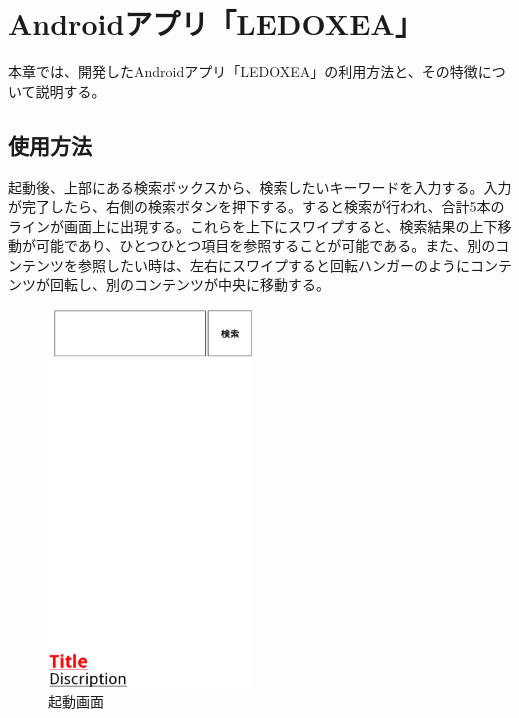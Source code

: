 \chapter{Androidアプリ「LEDOXEA」}
\label{chap:ledoxea}

本章では、開発したAndroidアプリ「LEDOXEA」の利用方法と、その特徴について説明する。

\section{使用方法}
起動後、上部にある検索ボックスから、検索したいキーワードを入力する。入力が完了したら、右側の検索ボタンを押下する。すると検索が行われ、合計5本のラインが画面上に出現する。これらを上下にスワイプすると、検索結果の上下移動が可能であり、ひとつひとつ項目を参照することが可能である。また、別のコンテンツを参照したい時は、左右にスワイプすると回転ハンガーのようにコンテンツが回転し、別のコンテンツが中央に移動する。
\begin{figure}[htbp]
\begin{center}
\includegraphics[height=10cm]{eps/le01.eps}
\caption{起動画面}
\label{le01}
\end{center}
\end{figure}

